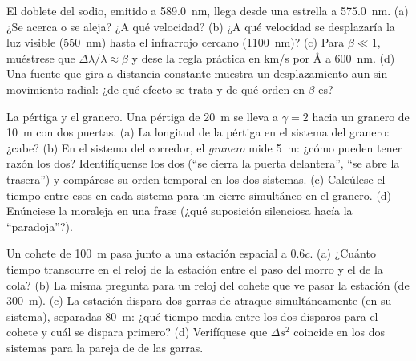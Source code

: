 \begin{exercise}[$\star\star$]\label{exo:b3:relativistic-kinematics:7}
El doblete del sodio, emitido a \qty{589.0}{nm}, llega desde una estrella a
\qty{575.0}{nm}. (a) ¿Se acerca o se aleja? ¿A qué velocidad? (b) ¿A qué
velocidad se desplazaría la luz visible (\qty{550}{nm}) hasta el infrarrojo
cercano (\qty{1100}{nm})? (c) Para $\beta \ll 1$, muéstrese que
$\Delta\lambda/\lambda \approx \beta$ y dese la regla práctica en km/s por
\unit{\angstrom} a \qty{600}{nm}. (d) Una fuente que gira a distancia
constante muestra un desplazamiento aun sin movimiento radial: ¿de qué
efecto se trata y de qué orden en $\beta$ es?
\end{exercise}

\begin{exercise}[$\star\star$]\label{exo:b3:relativistic-kinematics:8}
La pértiga y el granero. Una pértiga de \qty{20}{m} se lleva a $\gamma = 2$
hacia un granero de \qty{10}{m} con dos puertas. (a) La longitud de la
pértiga en el sistema del granero: ¿cabe? (b) En el sistema del corredor, el
\emph{granero} mide \qty{5}{m}: ¿cómo pueden tener razón los dos?
Identifíquense los dos  (``se cierra la puerta delantera'', ``se abre la
trasera'') y compárese su orden temporal en los dos sistemas. (c) Calcúlese el
tiempo entre esos  en cada sistema para un cierre simultáneo en el
granero. (d) Enúnciese la moraleja en una frase (¿qué suposición silenciosa
hacía la ``paradoja''?).
\end{exercise}

\begin{exercise}[$\star\star$]\label{exo:b3:relativistic-kinematics:9}
Un cohete de  \qty{100}{m} pasa junto a una estación
espacial a $0.6c$. (a) ¿Cuánto tiempo transcurre en el reloj de la estación
entre el paso del morro y el de la cola? (b) La misma pregunta para un reloj
del cohete que ve pasar la estación (de  \qty{300}{m}). (c) La
estación dispara dos garras de atraque simultáneamente (en su sistema),
separadas \qty{80}{m}: ¿qué tiempo media entre los dos disparos para el
cohete y cuál se dispara primero? (d) Verifíquese que $\Delta s^2$ coincide en
los dos sistemas para la pareja de  de las garras.
\end{exercise}

